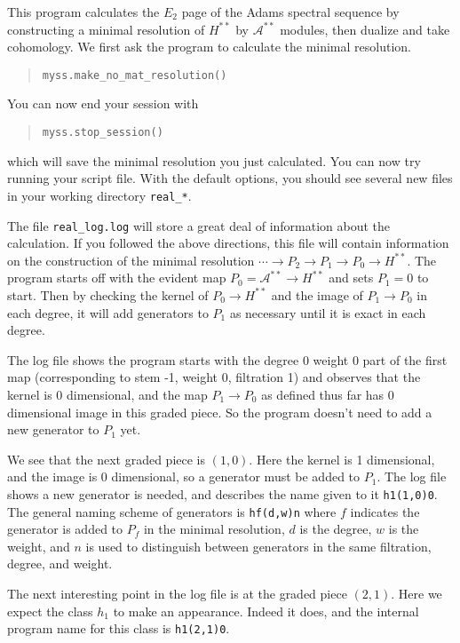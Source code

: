 \documentclass{article}
\begin{document}
This program calculates the $E_2$ page of the Adams spectral sequence
by constructing a minimal resolution of $H^{**}$ by $\mathcal{A}^{**}$
modules, then dualize and take cohomology. We first ask the program to
calculate the minimal resolution. 
\begin{quote}
\begin{verbatim}
myss.make_no_mat_resolution()
\end{verbatim}
\end{quote}
You can now end your session with 
\begin{quote}
\begin{verbatim}
myss.stop_session()
\end{verbatim}
\end{quote}
which will save the minimal resolution you just calculated. You can
now try running your script file. With the default options, you should
see several new files in your working directory \texttt{real\_*}. 

The file \texttt{real\_log.log} will store a great deal of information
about the calculation. If you followed the above directions, this file
will contain information on the construction of the minimal resolution
$\cdots \to P_2 \to P_1 \to P_0 \to H^{**}$. The program starts off
with the evident map $P_0 = \mathcal{A}^{**} \to H^{**}$ and sets
$P_1 = 0$ to start. Then by checking the kernel of $P_0 \to H^{**}$
and the image of $P_1 \to P_0$ in each degree, it will add generators
to $P_1$ as necessary until it is exact in each degree.

The log file shows the program starts with the degree 0 weight 0 part
of the first map (corresponding to stem -1, weight 0, filtration 1)
and observes that the kernel is 0 dimensional, and the map
$P_1 \to P_0$ as defined thus far has 0 dimensional image in this
graded piece. So the program doesn't need to add a new generator to
$P_1$ yet.

We see that the next graded piece is $(1,0)$. Here the kernel is 1
dimensional, and the image is 0 dimensional, so a generator must be
added to $P_1$. The log file shows a new generator is needed, and
describes the name given to it \texttt{h1(1,0)0}. The general naming
scheme of generators is \texttt{hf(d,w)n} where $f$ indicates the
generator is added to $P_f$ in the minimal resolution, $d$ is the
degree, $w$ is the weight, and $n$ is used to distinguish between
generators in the same filtration, degree, and weight.

The next interesting point in the log file is at the graded piece
$(2,1)$. Here we expect the class $h_1$ to make an appearance. Indeed
it does, and the internal program name for this class is
\texttt{h1(2,1)0}.
\end{document}
